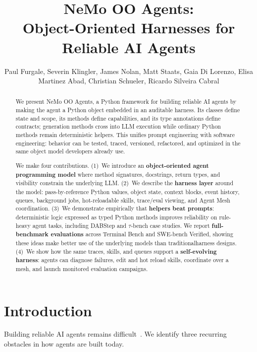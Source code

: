 \documentclass[11pt, logo, onecolumn, copyright, colorlinks=true, allcolors=blue]{nvidiatechreport}
\title{NeMo OO Agents:\\Object-Oriented Harnesses for Reliable AI Agents}
\author{Paul Furgale, Severin Klingler, James Nolan, Matt Staats, Gaia Di Lorenzo, Elisa Martinez Abad, Christian Schueler, Ricardo Silveira Cabral}
\begin{document}
\begin{abstract}
We present NeMo OO Agents, a Python framework for building reliable AI agents by
making the agent a Python object embedded in an auditable harness. Its classes
define state and scope, its methods define capabilities, and its type
annotations define contracts; generation methods cross into LLM execution while
ordinary Python methods remain deterministic helpers. This unifies prompt
engineering with software engineering: behavior can be tested, traced,
versioned, refactored, and optimized in the same object model developers already
use.

We make four contributions.
%
(1)~We introduce an \textbf{object-oriented agent programming model} where
method signatures, docstrings, return types, and visibility constrain the underlying LLM.
%
(2)~We describe the \textbf{harness layer} around the model: pass-by-reference
Python values, object state, context blocks, event history, queues, background
jobs, hot-reloadable skills, trace/eval viewing, and Agent Mesh coordination.
%
(3)~We demonstrate empirically that \textbf{helpers beat prompts}: deterministic
logic expressed as typed Python methods improves reliability on rule-heavy agent
tasks, including DABStep and $\tau$-bench case studies. We report \textbf{full-benchmark evaluations} across Terminal
Bench and SWE-bench Verified, showing these ideas make better use of the underlying models than traditionalharness designs.
%
(4)~We show how the same traces, skills, and queues support a
\textbf{self-evolving harness}: agents can diagnose failures, edit and hot reload
skills, coordinate over a mesh, and launch monitored evaluation campaigns.
\end{abstract}

\maketitle


\section{Introduction}
\label{sec:intro}

Building reliable AI agents remains
difficult~\cite{anthropic2024effectiveagents,anthropic2025longrunningharnesses,anthropic2025multiagent}.
We identify three recurring obstacles in how agents are built today.
\end{document}
